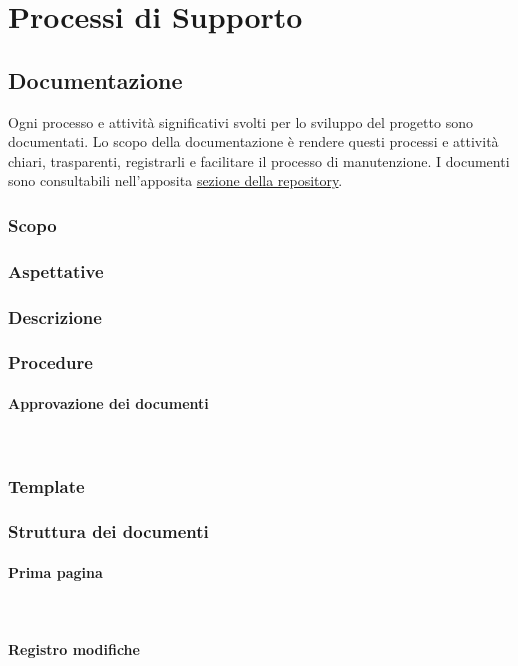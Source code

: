 \section{Processi di Supporto}
	\subsection{Documentazione}
		Ogni processo e attività significativi svolti per lo sviluppo del progetto sono documentati. Lo scopo della documentazione è rendere questi processi e attività chiari, trasparenti, registrarli e facilitare il processo di manutenzione. I documenti sono consultabili nell'apposita \href{https://github.com/8LabSolutions/Soldino}{\underline{sezione della repository}}. 
		\subsubsection{Scopo}
		\subsubsection{Aspettative}
		\subsubsection{Descrizione}
		\subsubsection{Procedure}
		\paragraph{Approvazione dei documenti} \mbox{}\\
		\subsubsection{Template}
		\subsubsection{Struttura dei documenti}
		\paragraph{Prima pagina} \mbox{}\\
		\paragraph{Registro modifiche} \mbox{}\\
